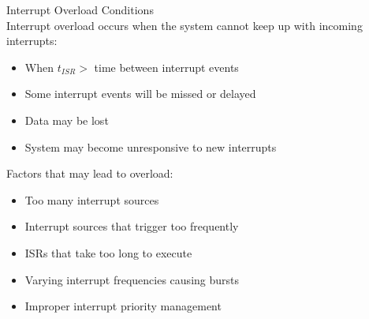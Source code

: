 \begin{concept}{Interrupt Overload Conditions}\\
Interrupt overload occurs when the system cannot keep up with incoming interrupts:
\begin{itemize}
    \item When $t_{ISR} >$ time between interrupt events
    \item Some interrupt events will be missed or delayed
    \item Data may be lost
    \item System may become unresponsive to new interrupts
\end{itemize}

Factors that may lead to overload:
\begin{itemize}
    \item Too many interrupt sources
    \item Interrupt sources that trigger too frequently
    \item ISRs that take too long to execute
    \item Varying interrupt frequencies causing bursts
    \item Improper interrupt priority management
\end{itemize}
\end{concept}

